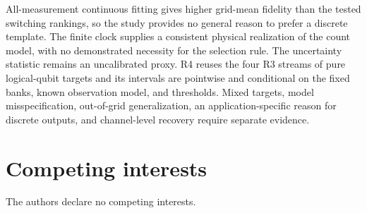 \documentclass{iopjournal}
\begin{document}
All-measurement continuous fitting gives higher grid-mean fidelity than the
tested switching rankings, so the study provides no general reason to prefer
a discrete template.  The finite clock supplies a consistent physical
realization of the count model, with no demonstrated necessity for the
selection rule.  The uncertainty statistic remains an uncalibrated proxy.
R4 reuses the four R3 streams of pure logical-qubit targets and its intervals
are pointwise and conditional on the fixed banks, known observation model, and
thresholds.  Mixed targets, model misspecification, out-of-grid generalization, an
application-specific reason for discrete outputs, and channel-level recovery
require separate evidence.


\section*{Competing interests}
The authors declare no competing interests.





\end{document}
